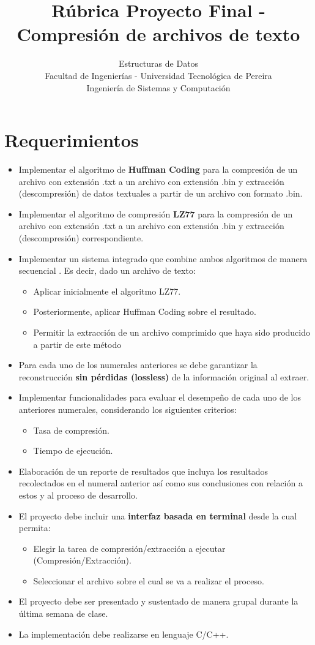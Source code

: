 \documentclass{article}
\title{Rúbrica Proyecto Final - Compresión de archivos de texto}
\author{Estructuras de Datos \\ Facultad de Ingenierías - Universidad Tecnológica de Pereira \\ Ingeniería de Sistemas y Computación}
\date{}
\begin{document}
\maketitle
\thispagestyle{empty}

\section{Requerimientos}
\begin{itemize}
    \item Implementar el algoritmo de \textbf{Huffman Coding} para la compresión de un archivo con extensión .txt a un archivo con extensión .bin y extracción (descompresión) de datos textuales a partir de un archivo con formato .bin.
    \item Implementar el algoritmo de compresión \textbf{LZ77} para la compresión de un archivo con extensión .txt a un archivo con extensión .bin y extracción (descompresión) correspondiente.
    \item Implementar un sistema integrado que combine ambos algoritmos de manera secuencial . Es decir, dado un archivo de texto:
    \begin{itemize}
        \item Aplicar inicialmente el algoritmo LZ77.
        \item Posteriormente, aplicar Huffman Coding sobre el resultado.
        \item Permitir la extracción de un archivo comprimido que haya sido producido a partir de este método
    \end{itemize}
    \item Para cada uno de los numerales anteriores se debe garantizar la reconstrucción \textbf{sin pérdidas (lossless)} de la información original al extraer.
    \item Implementar funcionalidades para evaluar el desempeño de cada uno de los anteriores numerales, considerando los siguientes criterios:
    \begin{itemize}
        \item Tasa de compresión.
        \item Tiempo de ejecución.
    \end{itemize}
    \item Elaboración de un reporte de resultados que incluya los resultados recolectados en el numeral anterior así como sus conclusiones con relación a estos y al proceso de desarrollo.
    \item El proyecto debe incluir una \textbf{interfaz basada en terminal} desde la cual permita:
    \begin{itemize}
        \item Elegir la tarea de compresión/extracción a ejecutar (Compresión/Extracción).
        \item Seleccionar el archivo sobre el cual se va a realizar el proceso.
    \end{itemize}
    \item El proyecto debe ser presentado y sustentado de manera grupal durante la última semana de clase.
    \item La implementación debe realizarse en lenguaje C/C++.
\end{itemize}
\end{document}
